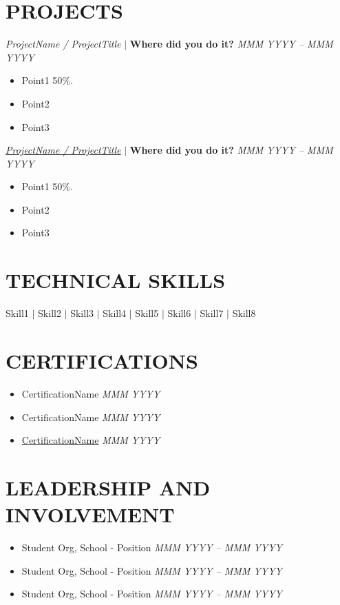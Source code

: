 \documentclass[a4paper,11pt]{article}
\begin{document}
\section*{PROJECTS}
\textit{ProjectName / ProjectTitle} $|$ \textbf{Where did you do it?} \hfill \textit{MMM YYYY – MMM YYYY} %
\vspace{-0.2cm}
\begin{itemize}[noitemsep]
   \item Point1 50\%.
  \item Point2
  \item Point3
\end{itemize}
\href{Insert Link to your project if you have one}{\textit{ProjectName / ProjectTitle}} $|$ \textbf{Where did you do it?} \hfill \textit{MMM YYYY – MMM YYYY} %
\vspace{-0.2cm}
\begin{itemize}[noitemsep]
   \item Point1 50\%.
  \item Point2
  \item Point3
\end{itemize}

\section*{TECHNICAL SKILLS}
Skill1 $|$ Skill2 $|$ Skill3 $|$ Skill4 $|$ Skill5 $|$ Skill6 $|$ Skill7 $|$ Skill8 

\section*{CERTIFICATIONS}
\begin{itemize}[noitemsep]
  \item CertificationName \hfill \textit{MMM YYYY}
  \item CertificationName \hfill \textit{MMM YYYY}
  \item \href{Insert Link if you have any}{CertificationName} \hfill \textit{MMM YYYY}
\end{itemize}

\section*{LEADERSHIP AND INVOLVEMENT}
\begin{itemize}[noitemsep]
  \item Student Org, School - Position \hfill \textit{MMM YYYY – MMM YYYY}
  \item Student Org, School - Position \hfill \textit{MMM YYYY – MMM YYYY}
  \item Student Org, School - Position \hfill \textit{MMM YYYY – MMM YYYY}
\end{itemize}
\end{document}
